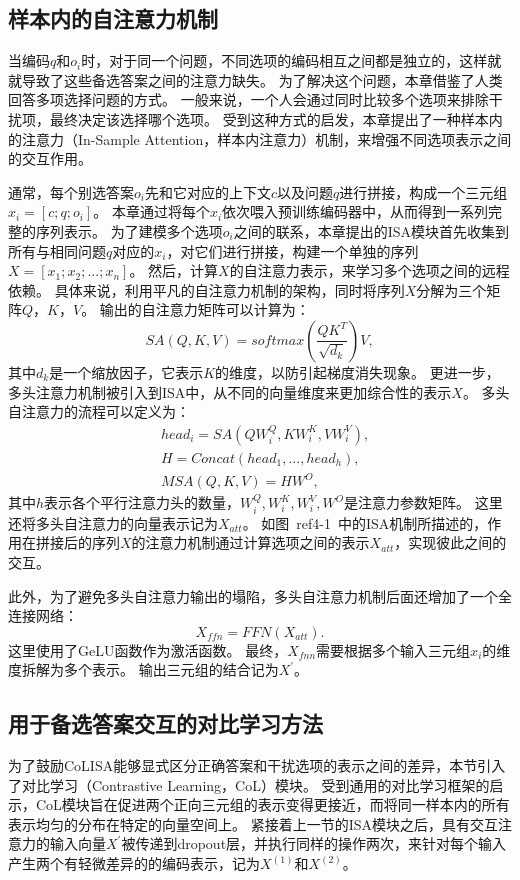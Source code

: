 

\subsection{样本内的自注意力机制}
当编码$q$和$o_i$时，对于同一个问题，不同选项的编码相互之间都是独立的，这样就就导致了这些备选答案之间的注意力缺失。
为了解决这个问题，本章借鉴了人类回答多项选择问题的方式。
一般来说，一个人会通过同时比较多个选项来排除干扰项，最终决定该选择哪个选项。
受到这种方式的启发，本章提出了一种样本内的注意力（In-Sample Attention，样本内注意力）机制，来增强不同选项表示之间的交互作用。

通常，每个别选答案$o_i$先和它对应的上下文$c$以及问题$q$进行拼接，构成一个三元组$x_i=[c;q;o_i]$。
本章通过将每个$x_i$依次喂入预训练编码器中，从而得到一系列完整的序列表示。
为了建模多个选项$o_i$之间的联系，本章提出的ISA模块首先收集到所有与相同问题$q$对应的$x_i$，对它们进行拼接，构建一个单独的序列$X=[x_1;x_2;...;x_n]$。
然后，计算$X$的自注意力表示，来学习多个选项之间的远程依赖。
具体来说，利用平凡的自注意力机制的架构，同时将序列$X$分解为三个矩阵$Q$，$K$，$V$。
输出的自注意力矩阵可以计算为：
\begin{equation}
    SA(Q,K,V)=softmax(\frac {QK^T}{\sqrt{d_k}})V,
\end{equation}
其中$d_k$是一个缩放因子，它表示$K$的维度，以防引起梯度消失现象\cite{vaswani2017attention}。
更进一步，多头注意力机制被引入到ISA中，从不同的向量维度来更加综合性的表示$X$。
多头自注意力的流程可以定义为：
\begin{align}
    & head_i = SA(QW^Q_i,KW^K_i,VW^V_i), \\
    & H = Concat(head_1,...,head_h), \\
    & MSA(Q,K,V) = HW^O,
\end{align}
其中$h$表示各个平行注意力头的数量，$W^Q_i,W^K_i,W^V_i,W^O$是注意力参数矩阵。
这里还将多头自注意力的向量表示记为$X_{att}$。
如图~ref{4-1}~中的ISA机制所描述的，作用在拼接后的序列$X$的注意力机制通过计算选项之间的表示$X_{att}$，实现彼此之间的交互。

此外，为了避免多头自注意力输出的塌陷\cite{vaswani2017attention,sukhbaatar2019augmenting}，多头自注意力机制后面还增加了一个全连接网络：
\begin{equation}
    X_{ffn}=FFN(X_{att}).
\end{equation}
这里使用了GeLU\cite{hendrycks2016gaussian}函数作为激活函数。
最终，$X_{fnn}$需要根据多个输入三元组$x_i$的维度拆解为多个表示。
输出三元组的结合记为$X^{'}$。

\subsection{用于备选答案交互的对比学习方法}
为了鼓励CoLISA能够显式区分正确答案和干扰选项的表示之间的差异，本节引入了对比学习（Contrastive Learning，CoL）模块。
受到通用的对比学习框架\cite{gao2021simcse}的启示，CoL模块旨在促进两个正向三元组的表示变得更接近，而将同一样本内的所有表示均匀的分布在特定的向量空间上。
紧接着上一节的ISA模块之后，具有交互注意力的输入向量$X^{'}$被传递到dropout层，并执行同样的操作两次，来针对每个输入产生两个有轻微差异的的编码表示，记为$X^{(1)}$和$X^{(2)}$。

